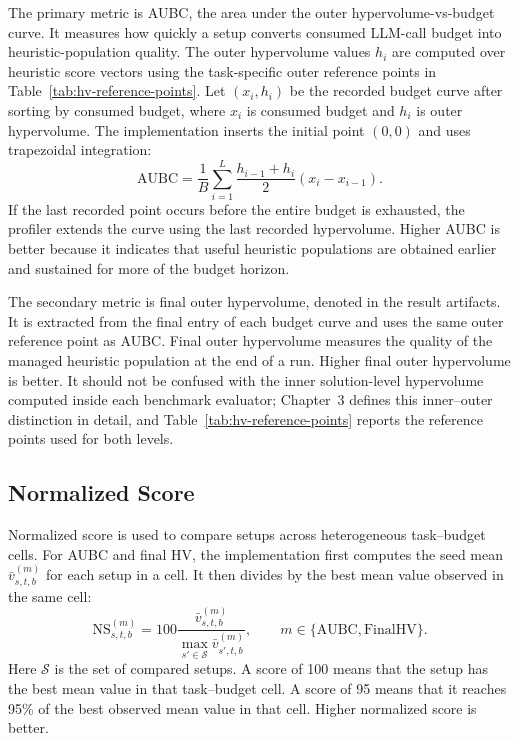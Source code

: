 \documentclass[../main.tex]{subfiles}
\begin{document}
The primary metric is AUBC, the area under the outer hypervolume-vs-budget curve. It measures how quickly a setup converts consumed LLM-call budget into heuristic-population quality. The outer hypervolume values $h_i$ are computed over heuristic score vectors using the task-specific outer reference points in Table~\ref{tab:hv-reference-points}. Let $(x_i,h_i)$ be the recorded budget curve after sorting by consumed budget, where $x_i$ is consumed budget and $h_i$ is outer hypervolume. The implementation inserts the initial point $(0,0)$ and uses trapezoidal integration:
\begin{equation}
  \mathrm{AUBC}
  =
  \frac{1}{B}
  \sum_{i=1}^{L}
  \frac{h_{i-1}+h_i}{2}
  (x_i-x_{i-1}).
  \label{eq:aubc-chapter5}
\end{equation}
If the last recorded point occurs before the entire budget is exhausted, the profiler extends the curve using the last recorded hypervolume. Higher AUBC is better because it indicates that useful heuristic populations are obtained earlier and sustained for more of the budget horizon.

The secondary metric is final outer hypervolume, denoted  in the result artifacts. It is extracted from the final  entry of each budget curve and uses the same outer reference point as AUBC. Final outer hypervolume measures the quality of the managed heuristic population at the end of a run. Higher final outer hypervolume is better. It should not be confused with the inner solution-level hypervolume computed inside each benchmark evaluator; Chapter~3 defines this inner--outer distinction in detail, and Table~\ref{tab:hv-reference-points} reports the reference points used for both levels.

\subsection{Normalized Score}

Normalized score is used to compare setups across heterogeneous task--budget cells. For AUBC and final HV, the implementation first computes the seed mean $\bar{v}^{(m)}_{s,t,b}$ for each setup in a cell. It then divides by the best mean value observed in the same cell:
\begin{equation}
  \mathrm{NS}^{(m)}_{s,t,b}
  =
  100
  \frac{\bar{v}^{(m)}_{s,t,b}}
       {\max_{s'\in\mathcal{S}} \bar{v}^{(m)}_{s',t,b}},
  \qquad
  m\in\{\mathrm{AUBC},\mathrm{FinalHV}\}.
  \label{eq:normalized-score-chapter5}
\end{equation}
Here $\mathcal{S}$ is the set of compared setups. A score of 100 means that the setup has the best mean value in that task--budget cell. A score of 95 means that it reaches 95\% of the best observed mean value in that cell. Higher normalized score is better.
\end{document}
